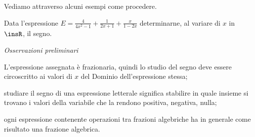 Vediamo attraverso alcuni esempi come procedere.
\begin{exrig}
\begin{esempio}
Data l’espressione $E=\frac 4{4x^2-1}+\frac 1{2x+1}+\frac x{1-2x}$ determinarne, al variare di $x$ in $\insR$, il segno.

\emph{Osservazioni preliminari}
\begin{itemize*}
\item L’espressione assegnata è frazionaria, quindi lo studio del segno deve essere circoscritto ai valori di $x$ del Dominio dell’espressione stessa;
\item studiare il segno di una espressione letterale significa stabilire in quale insieme si trovano i valori della variabile che la rendono positiva, negativa, nulla;
\item ogni espressione contenente operazioni tra frazioni algebriche ha in generale come risultato una frazione algebrica.
\end{itemize*}


\end{esempio}
\end{exrig}
